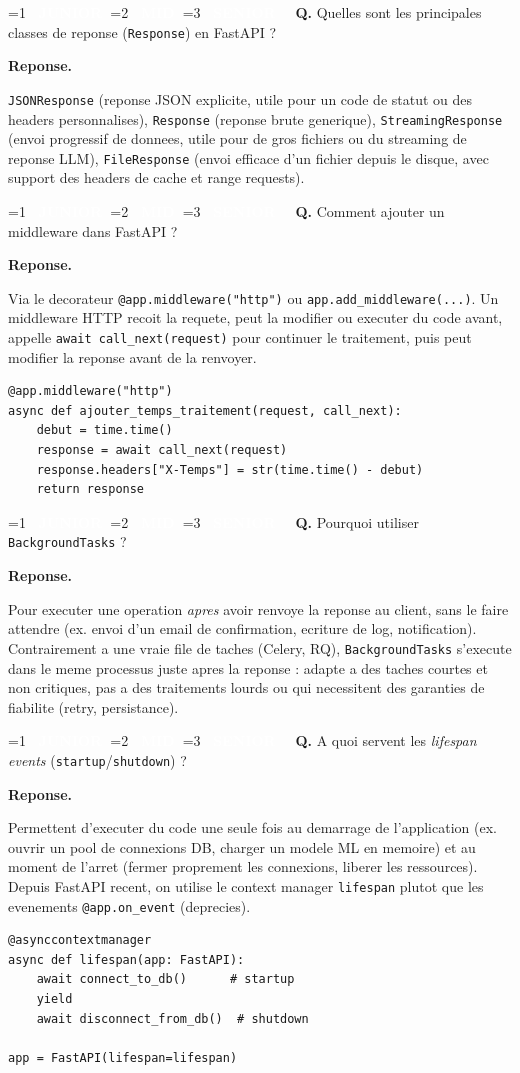 \documentclass[11pt,a4paper]{article}
\newcommand{\badgeJ}{\textcolor{white}{\colorbox{junior}{\small\bfseries\ JUNIOR\ }}}
\newcommand{\badgeM}{\textcolor{white}{\colorbox{mid}{\small\bfseries\ MID\ }}}
\newcommand{\badgeS}{\textcolor{white}{\colorbox{senior}{\small\bfseries\ SENIOR\ }}}
\newcounter{qcount}
\newenvironment{qa}[2]{%
  \stepcounter{qcount}%
  \par\vspace{6pt}%
  \noindent\colorbox{qbg}{\parbox{\dimexpr\linewidth-12pt}{\vspace{2pt}%
  \ifnum#1=1 \badgeJ\fi\ifnum#1=2 \badgeM\fi\ifnum#1=3 \badgeS\fi
  \ \textbf{Q\theqcount.} #2\vspace{2pt}}}\par\vspace{4pt}%
  \noindent\textbf{\color{accent}Reponse.}\ \ignorespaces
}{%
  \par\vspace{8pt}%
}
\begin{document}
\begin{qa}{2}{Quelles sont les principales classes de reponse (\texttt{Response}) en FastAPI ?}
\texttt{JSONResponse} (reponse JSON explicite, utile pour un code de statut ou
des headers personnalises), \texttt{Response} (reponse brute generique),
\texttt{StreamingResponse} (envoi progressif de donnees, utile pour de gros
fichiers ou du streaming de reponse LLM), \texttt{FileResponse} (envoi
efficace d'un fichier depuis le disque, avec support des headers de cache et
range requests).
\end{qa}

\begin{qa}{2}{Comment ajouter un middleware dans FastAPI ?}
Via le decorateur \texttt{@app.middleware("http")} ou
\texttt{app.add\_middleware(...)}. Un middleware HTTP recoit la requete,
peut la modifier ou executer du code avant, appelle
\texttt{await call\_next(request)} pour continuer le traitement, puis peut
modifier la reponse avant de la renvoyer.
\begin{lstlisting}
@app.middleware("http")
async def ajouter_temps_traitement(request, call_next):
    debut = time.time()
    response = await call_next(request)
    response.headers["X-Temps"] = str(time.time() - debut)
    return response
\end{lstlisting}
\end{qa}

\begin{qa}{2}{Pourquoi utiliser \texttt{BackgroundTasks} ?}
Pour executer une operation \emph{apres} avoir renvoye la reponse au client,
sans le faire attendre (ex. envoi d'un email de confirmation, ecriture de
log, notification). Contrairement a une vraie file de taches (Celery, RQ),
\texttt{BackgroundTasks} s'execute dans le meme processus juste apres la
reponse : adapte a des taches courtes et non critiques, pas a des traitements
lourds ou qui necessitent des garanties de fiabilite (retry, persistance).
\end{qa}

\begin{qa}{2}{A quoi servent les \emph{lifespan events} (\texttt{startup}/\texttt{shutdown}) ?}
Permettent d'executer du code une seule fois au demarrage de l'application
(ex. ouvrir un pool de connexions DB, charger un modele ML en memoire) et au
moment de l'arret (fermer proprement les connexions, liberer les ressources).
Depuis FastAPI recent, on utilise le context manager \texttt{lifespan} plutot
que les evenements \texttt{@app.on\_event} (deprecies).
\begin{lstlisting}
@asynccontextmanager
async def lifespan(app: FastAPI):
    await connect_to_db()      # startup
    yield
    await disconnect_from_db()  # shutdown

app = FastAPI(lifespan=lifespan)
\end{lstlisting}
\end{qa}
\end{document}
